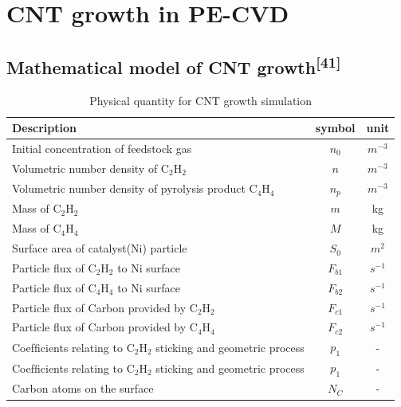 \newpage
\section{CNT growth in PE-CVD}
\subsection{Mathematical model of CNT growth\textsuperscript{[41]}}
\begin{table}[H]
\centering
\caption{Physical quantity for CNT growth simulation}
\begin{tabular}{@{}lcc@{}}
\toprule
Description                                                                  & symbol   & unit      \\ \midrule
Initial concentration of feedstock gas                                       & $n_{0}$  & $m^{-3}$  \\
Volumetric number density of  $\mathrm{C_{2}H_{2}}$                             & $n$      & $m^{-3}$  \\
Volumetric number density of pyrolysis product $\mathrm{C_{4}H_{4}}$            & $n_{p}$  & $m^{-3}$  \\
Mass of $\mathrm{C_{2}H_{2}}$                                                & $m$      & kg        \\
Mass of $\mathrm{C_{4}H_{4}}$                                                & $M$      & kg        \\
Surface area of catalyst(Ni) particle                                        & $S_{0}$  & $m^{2}$   \\
Particle ﬂux of  $\mathrm{C_{2}H_{2}}$ to Ni surface                         & $F_{b1}$ & $s^{-1}$  \\
Particle ﬂux of $\mathrm{C_{4}H_{4}}$ to Ni surface                          & $F_{b2}$ & $s^{-1}$  \\
Particle flux of Carbon provided by $\mathrm{C_{2}H_{2}}$                    & $F_{c1}$ & $s^{-1}$  \\
Particle flux of Carbon provided by $\mathrm{C_{4}H_{4}}$                    & $F_{c2}$ & $s^{-1}$  \\
Coefﬁcients relating to $\mathrm{C_{2}H_{2}}$ sticking and geometric process  & $p_{1}$  & -         \\
Coefﬁcients relating to $\mathrm{C_{2}H_{2}}$ sticking and geometric process & $p_{1}$  & -         \\
Carbon atoms on the surface                                                  & $N_{C}$  & -         \\

\end{tabular}
\end{table}
